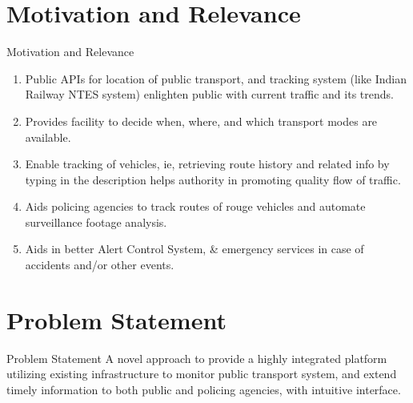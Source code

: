 \documentclass{beamer}
\begin{document}
\section{Motivation and Relevance}
\begin{frame}{Motivation and Relevance}
	\begin{enumerate}
	    \item Public APIs for location of public transport, and tracking system (like Indian Railway NTES system) enlighten public with current traffic and its trends.
	    \item Provides facility to decide when, where, and which transport modes are available.
		\item Enable tracking of vehicles, ie, retrieving route history and related info by typing in the description helps authority in promoting quality flow of traffic.
		\item Aids policing agencies to track routes of rouge vehicles and automate surveillance footage analysis.
		\item Aids in better Alert Control System, \& emergency services in case of accidents and/or other events.
		
	\end{enumerate}
\end{frame}
\section{Problem Statement}
\begin{frame}{Problem Statement}
	A novel approach to provide a highly integrated platform utilizing existing infrastructure to monitor public transport system, and extend timely information to both public and policing agencies, with intuitive interface.
\end{frame}


\end{document}
